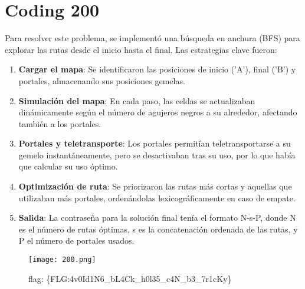\documentclass{article}
\begin{document}
\section*{Coding 200}
Para resolver este problema, se implementó una búsqueda en anchura (BFS) para explorar las rutas desde el inicio hasta el final. Las estrategias clave fueron:
\begin{enumerate}
  \item \textbf{Cargar el mapa}: Se identificaron las posiciones de inicio ('A'), final ('B') y portales, almacenando sus posiciones gemelas.

  \item \textbf{Simulación del mapa}: En cada paso, las celdas se actualizaban dinámicamente según el número de agujeros negros a su alrededor, afectando también a los portales.

  \item \textbf{Portales y teletransporte}: Los portales permitían teletransportarse a su gemelo instantáneamente, pero se desactivaban tras su uso, por lo que había que calcular su uso óptimo.

  \item \textbf{Optimización de ruta}: Se priorizaron las rutas más cortas y aquellas que utilizaban más portales, ordenándolas lexicográficamente en caso de empate.

  \item \textbf{Salida}: La contraseña para la solución final tenía el formato N-s-P, donde N es el número de rutas óptimas, s es la concatenación ordenada de las rutas, y P el número de portales usados.
\end{enumerate}

\begin{figure}[H]
  \centering
  \texttt{[image: 200.png]}
  \caption{flag: \{FLG:4v0Id1N6\_bL4Ck\_h0l35\_c4N\_b3\_7r1cKy\}}
\end{figure}
\end{document}
